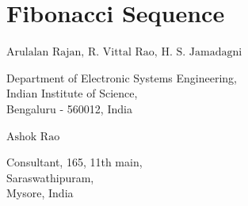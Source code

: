 \chapter{Fibonacci Sequence}




\vskip 0.8cm

\begin{center}
{\large\uppercase{$\text{Arulalan Rajan, R. Vittal Rao, H. S. Jamadagni}$}} 

\vskip -6pt

Department of Electronic Systems Engineering,\\ Indian Institute of Science,\\ Bengaluru - 560012, India 

\end{center}


\begin{center}
{\large\uppercase{$\text{Ashok Rao}$}} 

\vskip -6pt

Consultant, 165, 11th main,\\ Saraswathipuram,\\ Mysore, India

\end{center}



\vfill




\newpage

